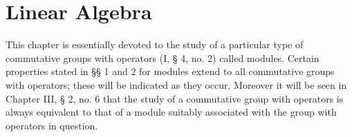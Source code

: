 \chapter{Linear Algebra}

This chapter is essentially devoted to the study of a particular type of commutative groups with operators (I, § 4, no. 2) called modules. Certain properties stated in §§ 1 and 2 for modules extend to all commutative groups with operators; these will be indicated as they occur. Moreover it will be seen in Chapter III, § 2, no. 6 that the study of a commutative group with operators is always equivalent to that of a module suitably associated with the group with operators in question.

